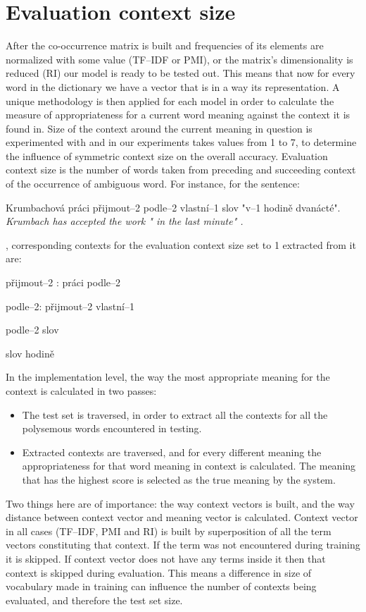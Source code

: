 \section{Evaluation context size} 
After the co-occurrence matrix is built and frequencies of its elements are normalized with some 
value (TF--IDF or PMI), or the matrix's dimensionality is reduced (RI) our model is ready to be tested out.
This means that now for every word in the dictionary we have a vector that is in a way its representation.
A unique methodology is then applied for each model in order to calculate the measure of appropriateness for a current word meaning against the context it is found in. Size of the context around the current meaning in question is experimented with and in our experiments takes values from 1 to 7, to determine the influence of symmetric context size on the overall accuracy. 
Evaluation context size is the number of words taken from preceding and succeeding context of the 
occurrence of ambiguous word. For instance, for the sentence:
\begin{examples}
\item Krumbachov\'a pr\'aci p\v{r}ijmout--2 podle--2 vlastn\'i--1 slov "v--1 hodin\v{e} dvan\'act\'e".
\glt \textit{ Krumbach has accepted the work " in the last minute"  .}
\end{examples}
, corresponding contexts for the evaluation context size set to 1 extracted from it are:
\begin{examples}
\item p\v{r}ijmout--2 : pr\'aci  podle--2
\item  podle--2: p\v{r}ijmout--2 vlastn\'i--1
\item podle--2 slov
\item slov  hodin\v{e}
\end{examples}


In the implementation level, the way the most appropriate meaning for the context is calculated in two passes:
\begin{itemize}
\item The test set is traversed, in order to extract all the contexts for all the polysemous words 
encountered  in testing.
\item Extracted contexts are traversed, and for every different meaning the appropriateness for that 
word meaning in context is calculated. The meaning that has the highest score is selected as the 
true meaning by the system.
\end{itemize}  
Two things here are of importance: the way context vectors is built, and the way distance between context vector and meaning vector is calculated. Context vector in all cases (TF--IDF, PMI and RI) is 
built by superposition of all the term vectors constituting that context. If the term was not encountered 
during training it is skipped. If context vector does not have any terms inside it then that context is skipped during evaluation. This means a difference in size of vocabulary made in training can influence the number
of contexts being evaluated, and therefore the test set size. 

